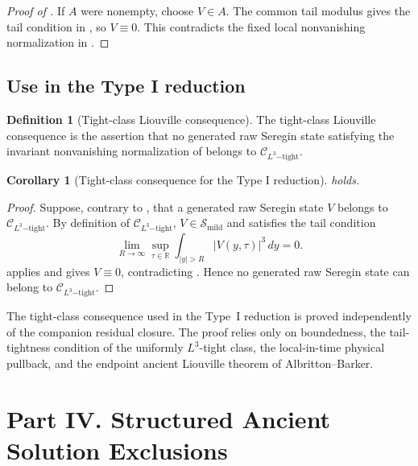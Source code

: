 \documentclass[11pt]{amsart}
\theoremstyle{plain}
\newtheorem{corollary}[corollary]{Corollary}
\theoremstyle{definition}
\newtheorem{definition}[definition]{Definition}
\theoremstyle{remark}
\numberwithin{equation}{section}
\newcommand{\R}{\mathbb R}
\newcommand{\calS}{\mathcal S}
\newcommand{\calC}{\mathcal C}
\begin{document}
\begin{proof}[Proof of ]
If \(A\) were nonempty, choose \(V\in A\).  The common tail modulus gives the
tail condition in , so \(V\equiv0\).  This contradicts
the fixed local nonvanishing normalization in .
\end{proof}

\subsection{Use in the Type I reduction}

\begin{definition}[Tight-class Liouville consequence]
\label{p2:def:tight-class-input}
The tight-class Liouville consequence is the assertion that no generated raw
Seregin state satisfying the invariant nonvanishing normalization of
 belongs to \(\calC_{L^3\mathrm{-tight}}\).
\end{definition}

\begin{corollary}[Tight-class consequence for the Type I reduction]
\label{p2:cor:tight-input-for-paper-I}
 holds.
\end{corollary}

\begin{proof}
Suppose, contrary to , that a generated raw
Seregin state \(V\) belongs to \(\calC_{L^3\mathrm{-tight}}\).  By definition
of \(\calC_{L^3\mathrm{-tight}}\), \(V\in\calS_{\mathrm{mild}}\) and satisfies
the tail condition
\[
   \lim_{R\to\infty}
   \sup_{\tau\in\R}\int_{|y|>R}|V(y,\tau)|^3\,dy=0 .
\]
 applies and gives \(V\equiv0\), contradicting
.  Hence no generated raw Seregin state can
belong to \(\calC_{L^3\mathrm{-tight}}\).
\end{proof}

The tight-class consequence used in the Type~I reduction is proved
independently of the companion residual closure.  The proof relies only on boundedness, the
tail-tightness condition of the uniformly \(L^3\)-tight class, the
local-in-time physical pullback, and the endpoint ancient Liouville theorem of
Albritton--Barker.



\clearpage
\section*{Part IV. Structured Ancient Solution Exclusions}
\end{document}
